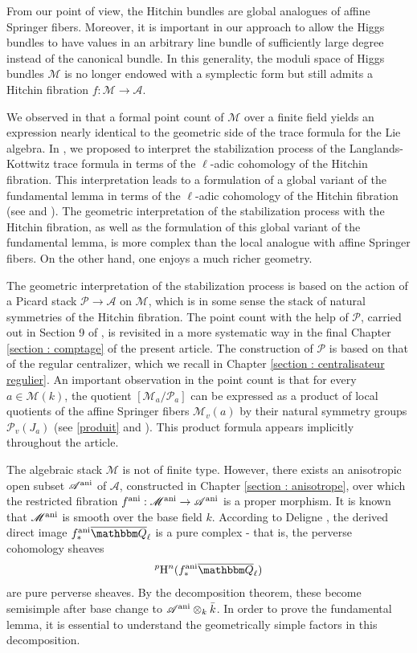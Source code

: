 \documentclass[12pt,english]{smfart}
\numberwithin{equation}{subsection}
\theoremstyle{remark}
\newcommand\calA{{\mathscr A}}
\newcommand\calP{{\mathscr P}}
\newcommand\calM{{\mathscr M}}
\newcommand\QQ{{\mathbbm Q}}
\newcommand\rmH{{\rm H}}
\newcommand\ani{{\rm ani}}
\newcommand\Ql{{\overline\QQ_\ell}}
\begin{document}
From our point of view, the Hitchin bundles are global analogues of affine Springer fibers. Moreover, it is important in our approach to allow the Higgs bundles to have values in an arbitrary line bundle of sufficiently large degree instead of the canonical bundle. In this generality, the moduli space of Higgs bundles $\calM$ is no longer endowed with a symplectic form but still admits a Hitchin fibration $f:\calM\rightarrow \calA$.

We observed in \cite{N} that a formal point count of $\calM$ over a finite field yields an expression nearly identical to the geometric side of the trace formula for the Lie algebra. In \cite{N}, we proposed to interpret the stabilization process of the Langlands-Kottwitz trace formula in terms of the $\ell$-adic cohomology of the Hitchin fibration. This interpretation leads to a formulation of a global variant of the fundamental lemma in terms of the $\ell$-adic cohomology of the Hitchin fibration (see \cite{Dat} and \cite{N-ICM}). The geometric interpretation of the stabilization process with the Hitchin fibration, as well as the formulation of this global variant of the fundamental lemma, is more complex than the local analogue with affine Springer fibers. On the other hand, one enjoys a much richer geometry.

The geometric interpretation of the stabilization process is based on the action of a Picard stack $\calP\rightarrow \calA$ on $\calM$, which is in some sense the stack of natural symmetries of the Hitchin fibration. The point count with the help of $\calP$, carried out in Section 9 of \cite{N}, is revisited in a more systematic way in the final Chapter \ref{section : comptage} of the present article. The construction of $\calP$ is based on that of the regular centralizer, which we recall in Chapter \ref{section : centralisateur regulier}. An important observation in the point count is that for every $a\in\calM(k)$, the quotient $[\calM_a/\calP_a]$ can be expressed as a product of local quotients of the affine Springer fibers $\calM_v(a)$ by their natural symmetry groups $\calP_v(J_a)$ (see \ref{produit} and \cite[4.6]{N}). This product formula appears implicitly throughout the article.

The algebraic stack $\calM$ is not of finite type. However, there exists an anisotropic open subset $\calA^\ani$ of $\calA$, constructed in Chapter \ref{section : anisotrope}, over which the restricted fibration $f^\ani:\calM^\ani \rightarrow \calA^\ani$ is a proper morphism. It is known that $\calM^\ani$ is smooth over the base field $k$. According to Deligne \cite{Weil2}, the derived direct image $f^\ani_* \Ql$ is a pure complex - that is, the perverse cohomology sheaves
$${}^p\rmH^n(f^\ani_*\Ql)$$
are pure perverse sheaves. By the decomposition theorem, these become semisimple after base change to $\calA^\ani\otimes_k \bar k$. In order to prove the fundamental lemma, it is essential to understand the geometrically simple factors in this decomposition.
\end{document}

